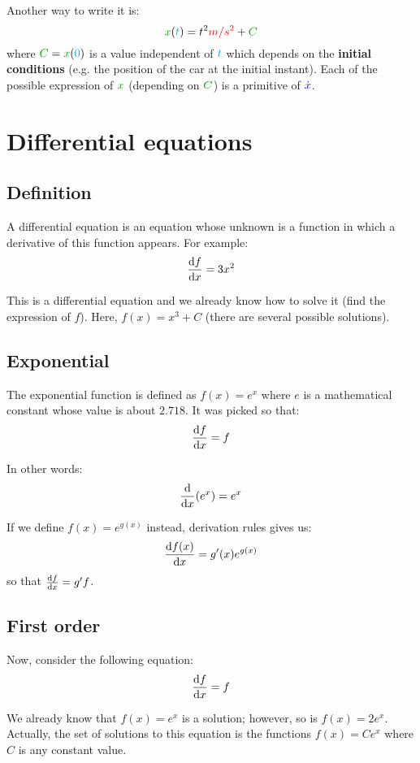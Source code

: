 Another way to write it is:
\[
\dist{x}(\delay{t})
= t^2 \accel{m/s^2} + \dist{C}
\]
where $\dist{C} = \dist{x}(\delay{0})$ is a value independent of
$\textcolor{cyan}{t}$ which depends on the \textbf{initial conditions} (e.g. the
position of the car at the initial instant). Each of the possible
expression of $\dist{x}$ (depending on $\dist{C}$) is a primitive of
$\textcolor{blue}{\dot x}$.



\section{Differential equations}


\subsection{Definition}

A differential equation is an equation whose unknown is a function in
which a derivative of this function appears. For example:
\[
\frac {\mathrm{d} f} {\mathrm{d} x} = 3x^2
\]

This is a differential equation and we already know how to solve it
(find the expression of $f$). Here, $f(x) = x^3 + C$ (there are several
possible solutions).


\subsection{Exponential}

The exponential function is defined as $f(x) = e^x$ where $e$ is a
mathematical constant whose value is about $2.718$. It was picked so that:
\[
\frac {\mathrm{d} f} {\mathrm{d} x} = f
\]

In other words:
\[
\frac {\mathrm{d}} {\mathrm{d} x} (e^x) = e^x
\]

\begin{remark}
If we define $f(x) = e^{g(x)}$ instead, derivation rules
gives us:
\[
\frac {\mathrm{d} f(x)} {\mathrm{d} x}
= g'(x) e^{g(x)}
\]
so that $\frac {\mathrm{d} f} {\mathrm{d} x} = g' f$.
\end{remark}


\subsection{First order}

Now, consider the following equation:
\[
\frac {\mathrm{d} f} {\mathrm{d} x} = f
\]

We already know that $f(x) = e^x$ is a solution; however, so is $f(x) =
2 e^x$. Actually, the set of solutions to this equation is the functions
$f(x) = C e^x$ where $C$ is any constant value.

